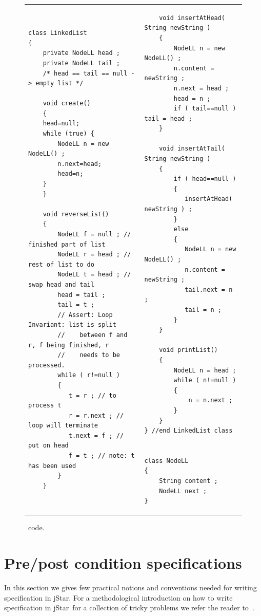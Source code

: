 \documentclass[11pt]{article}
\newcommand{\jStar}{{\sf jStar}}
\begin{document}
\begin{figure}[t]
  \centering
  \begin{tabular}{l|l}
    \begin{lstlisting}
class LinkedList
{
    private NodeLL head ;
    private NodeLL tail ;
    /* head == tail == null -> empty list */

    void create()
    {
	head=null;
	while (true) {
	    NodeLL n = new NodeLL() ;
	    n.next=head;
	    head=n;
	}
    }
    
    void reverseList()
    {
        NodeLL f = null ; // finished part of list
        NodeLL r = head ; // rest of list to do
        NodeLL t = head ; // swap head and tail
        head = tail ;
        tail = t ;
        // Assert: Loop Invariant: list is split
        //    between f and r, f being finished, r
        //    needs to be processed.
        while ( r!=null )
        {
           t = r ; // to process t
           r = r.next ; // loop will terminate 
           t.next = f ; // put on head
           f = t ; // note: t has been used
        }
    }
\end{lstlisting}
& \qquad \quad
\begin{lstlisting}            
    void insertAtHead( String newString )
    {
        NodeLL n = new NodeLL() ;
        n.content = newString ;
        n.next = head ;
        head = n ;
        if ( tail==null ) tail = head ;
    }

    void insertAtTail( String newString )
    {
        if ( head==null )
        {
           insertAtHead( newString ) ;
        }
        else
        {
           NodeLL n = new NodeLL() ;
           n.content = newString ;
           tail.next = n ;
           tail = n ;
        }
    }
    
    void printList()
    {
        NodeLL n = head ;
        while ( n!=null )
        {
            n = n.next ;
        }
    }    
} //end LinkedList class


class NodeLL
{
    String content ;
    NodeLL next ;
}
\end{lstlisting}
  \end{tabular}
  \caption{\linkedlist \ code.}
  \label{tab:linkedlist}
\end{figure}


\section{Pre/post condition specifications}
\label{sec:pre/post}
In this section we gives few practical notions and conventions needed
for writing specification in \jStar. For a methodological introduction
on how to write specification in \jStar \ for a collection of tricky
problems we refer the reader to~\cite{jstar}.
\end{document}

